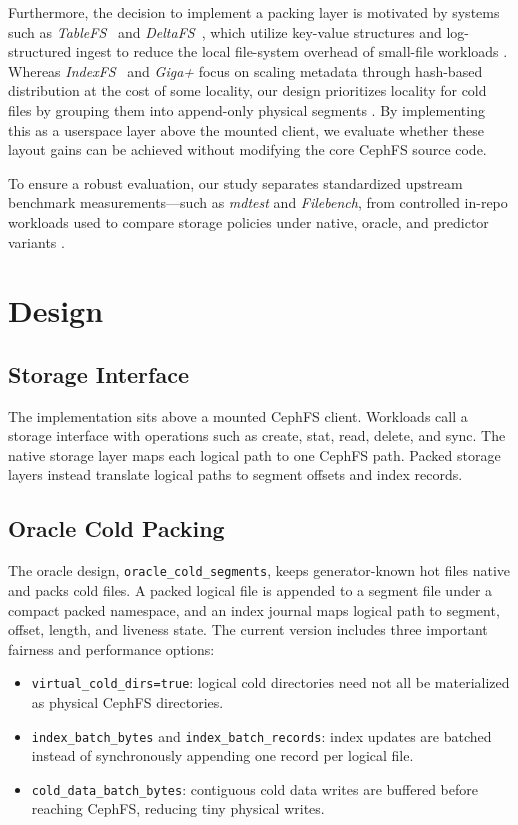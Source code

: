 \documentclass[letterpaper,twocolumn,10pt]{article}
\begin{document}
Furthermore, the decision to implement a packing layer is motivated by systems such as \emph{TableFS}~\cite{tablefs} and \emph{DeltaFS}~\cite{deltafs}, which utilize key-value structures and log-structured ingest to reduce the local file-system overhead of small-file workloads \cite{tablefs, deltafs}. Whereas \emph{IndexFS}~\cite{indexfs} and \emph{Giga+} focus on scaling metadata through hash-based distribution at the cost of some locality, our design prioritizes locality for cold files by grouping them into append-only physical segments \cite{indexfs}. By implementing this as a userspace layer above the mounted client, we evaluate whether these layout gains can be achieved without modifying the core CephFS source code.

To ensure a robust evaluation, our study separates standardized upstream benchmark measurements—such as \emph{mdtest} and \emph{Filebench}, from controlled in-repo workloads used to compare storage policies under native, oracle, and predictor variants \cite{ior-mdtest, filebench}.


\section{Design}

\subsection{Storage Interface}

The implementation sits above a mounted CephFS client. Workloads call a storage interface with operations such as create, stat, read, delete, and sync. The native storage layer maps each logical path to one CephFS path. Packed storage layers instead translate logical paths to segment offsets and index records.


\subsection{Oracle Cold Packing}

The oracle design, \texttt{oracle\_cold\_segments}, keeps generator-known hot
files native and packs cold files. A packed logical file is appended to a segment
file under a compact packed namespace, and an index journal maps logical path to
segment, offset, length, and liveness state. The current version includes three
important fairness and performance options:

\begin{itemize}[leftmargin=*]
\item \texttt{virtual\_cold\_dirs=true}: logical cold directories need not all
be materialized as physical CephFS directories.
\item \texttt{index\_batch\_bytes} and \texttt{index\_batch\_records}: index
updates are batched instead of synchronously appending one record per logical
file.
\item \texttt{cold\_data\_batch\_bytes}: contiguous cold data writes are
buffered before reaching CephFS, reducing tiny physical writes.
\end{itemize}
\end{document}
